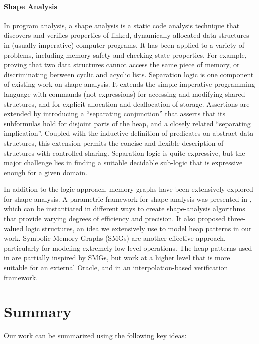 \paragraph{Shape Analysis}
In program analysis, a shape analysis is a static code analysis technique that discovers and verifies properties of linked, dynamically allocated data structures in (usually imperative) computer programs. It has been applied to a variety of problems, including memory safety and checking state properties. For example, proving that two data structures cannot access the same piece of memory, or discriminating between cyclic and acyclic lists. Separation logic \cite{calcagano11,reynolds02} is one component of existing work on shape analysis. It extends the simple imperative programming language with commands (not expressions) for accessing and modifying shared structures, and for explicit allocation and deallocation of storage. Assertions are extended by introducing a “separating conjunction” that asserts that its subformulas hold for disjoint parts of the heap, and a closely related “separating implication”. Coupled with the inductive definition of predicates on abstract data structures, this extension permits the concise and flexible description of
structures with controlled sharing. Separation logic is quite expressive, but the major challenge lies in finding a suitable decidable sub-logic that is expressive enough for a given domain.

In addition to the logic approach, memory graphs have been extensively explored for shape analysis. A parametric framework for shape analysis was presented in \cite{sagiv02}, which can be instantiated in different ways to create shape-analysis algorithms that provide varying degrees of efficiency and precision. It also proposed three-valued logic structures, an idea we extensively use to model heap patterns in our work. Symbolic Memory Graphs (SMGs) \cite{dudka13} are another effective approach, particularly for modeling extremely low-level operations. The heap patterns used in \verifier are partially inspired by SMGs, but work at a higher level that is more suitable for an external Oracle, and in an interpolation-based verification framework.

\section{Summary}
Our work can be summarized using the following key ideas:

